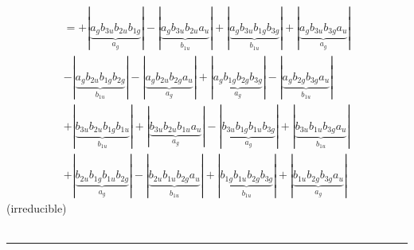 \documentclass{article}
\begin{document}
\begin{multline*}
\end{multline*}\begin{multline*}
=+\left|\underbrace{a_{g} b_{3u} b_{2u} b_{1g}}_{a_{g}}\right|-\left|\underbrace{a_{g} b_{3u} b_{2u} a_{u}}_{b_{1u}}\right|+\left|\underbrace{a_{g} b_{3u} b_{1g} b_{3g}}_{b_{1u}}\right|+\left|\underbrace{a_{g} b_{3u} b_{3g} a_{u}}_{a_{g}}\right|\\
-\left|\underbrace{a_{g} b_{2u} b_{1g} b_{2g}}_{b_{1u}}\right|-\left|\underbrace{a_{g} b_{2u} b_{2g} a_{u}}_{a_{g}}\right|+\left|\underbrace{a_{g} b_{1g} b_{2g} b_{3g}}_{a_{g}}\right|-\left|\underbrace{a_{g} b_{2g} b_{3g} a_{u}}_{b_{1u}}\right|\\
+\left|\underbrace{b_{3u} b_{2u} b_{1g} b_{1u}}_{b_{1u}}\right|+\left|\underbrace{b_{3u} b_{2u} b_{1u} a_{u}}_{a_{g}}\right|-\left|\underbrace{b_{3u} b_{1g} b_{1u} b_{3g}}_{a_{g}}\right|+\left|\underbrace{b_{3u} b_{1u} b_{3g} a_{u}}_{b_{1u}}\right|\\
+\left|\underbrace{b_{2u} b_{1g} b_{1u} b_{2g}}_{a_{g}}\right|-\left|\underbrace{b_{2u} b_{1u} b_{2g} a_{u}}_{b_{1u}}\right|+\left|\underbrace{b_{1g} b_{1u} b_{2g} b_{3g}}_{b_{1u}}\right|+\left|\underbrace{b_{1u} b_{2g} b_{3g} a_{u}}_{a_{g}}\right|
\end{multline*}(irreducible)\\ \\
\hrule\newpage 
\end{document}
